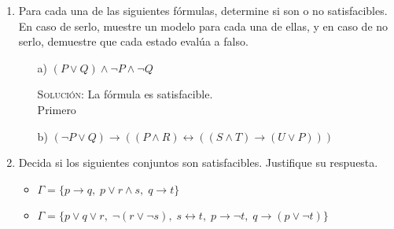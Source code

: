 \documentclass[letterpaper,11pt]{article}
\begin{document}
\begin{enumerate}
\begin{itemize}
        \item[c)] $(A \land B) → Q ≡ A → (B → Q)$
        \begin{proof}
            \begin{align*}
                (A \land B) → Q 
                ≡& \; \neg (A \land B) \lor Q
                && \text{equivalencia de $→$} \\ 
                ≡& \; (\neg A \lor \neg B) \lor Q
                && \text{De Morgan} \\ 
                ≡& \; \neg A \lor (\neg B \lor Q)
                && \text{asociatividad} \\ 
                ≡& \; A → (B → Q)
                && \text{equivalencia de $→$}
            \end{align*}
        \end{proof}
    \end{itemize}

    \item Para cada una de las siguientes fórmulas, determine si son o no 
    satisfacibles. En caso de serlo, muestre un modelo para cada una de ellas,
    y en caso de no serlo, demuestre que cada estado evalúa a falso.

    \begin{itemize}
        \item[a)] $(P \lor Q) \land \neg P \land \neg Q$ 

        \textsc{Solución:} La fórmula es satisfacible. \\ 
        Primero 

        \item[b)] $(\neg P \lor Q) → ((P \land R) ↔ ((S \land T) → (U \lor P)))$
    \end{itemize}

    \item Decida si los siguientes conjuntos son satisfacibles. Justifique 
    su respuesta.

    \begin{itemize}
        \item $\Gamma = \{p → q, \; p \lor r \land s, \; q → t\}$
        \item $\Gamma = \{p \lor q \lor r, \; \neg (r \lor \neg s), \; s ↔ t, \;
                          p → \neg t, \; q → (p \lor \neg t)\}$        
    \end{itemize}


\end{enumerate}
\end{document}
